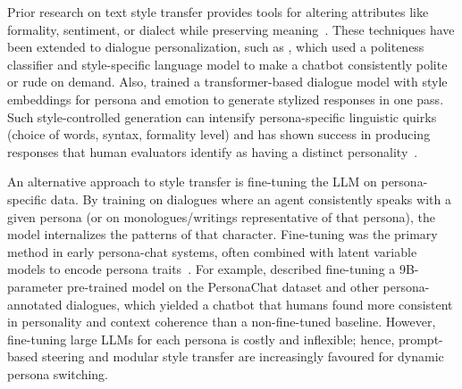 Prior research on text style transfer provides tools for altering attributes like formality, sentiment, or dialect while preserving meaning~\cite{niu-bansal-2018-polite, sudhakar-etal-2019-transforming}. These techniques have been extended to dialogue personalization, such as \citet{niu-bansal-2018-polite}, which used a politeness classifier and style-specific language model to make a chatbot consistently polite or rude on demand. Also, \citet{zhang-etal-2018-personalizing} trained a transformer-based dialogue model with style embeddings for persona and emotion to generate stylized responses in one pass. Such style-controlled generation can intensify persona-specific linguistic quirks (choice of words, syntax, formality level) and has shown success in producing responses that human evaluators identify as having a distinct personality~\cite{zhang-etal-2018-personalizing}.

An alternative approach to style transfer is fine-tuning the LLM on persona-specific data. By training on dialogues where an agent consistently speaks with a given persona (or on monologues/writings representative of that persona), the model internalizes the patterns of that character. Fine-tuning was the primary method in early persona-chat systems, often combined with latent variable models to encode persona traits~\cite{li-etal-2016-persona}. For example, \citet{roller-etal-2021-recipes} described fine-tuning a 9B-parameter pre-trained model on the PersonaChat dataset and other persona-annotated dialogues, which yielded a chatbot that humans found more consistent in personality and context coherence than a non-fine-tuned baseline. However, fine-tuning large LLMs for each persona is costly and inflexible; hence, prompt-based steering and modular style transfer are increasingly favoured for dynamic persona switching.


